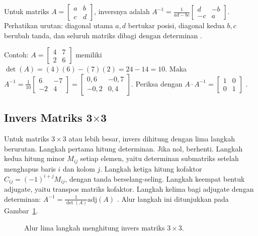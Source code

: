 \documentclass[11pt,a4paper]{article}
\begin{document}
Untuk matriks $A=\begin{bmatrix}a&b\\c&d\end{bmatrix}$, inversnya adalah $A^{-1}=\frac{1}{ad-bc}\begin{bmatrix}d&-b\\-c&a\end{bmatrix}$. Perhatikan urutan: diagonal utama $a,d$ bertukar posisi, diagonal kedua $b,c$ berubah tanda, dan seluruh matriks dibagi dengan determinan \cite{anton}.

Contoh: $A=\begin{bmatrix}4&7\\2&6\end{bmatrix}$ memiliki $\det(A)=(4)(6)-(7)(2)=24-14=10$. Maka $A^{-1}=\frac{1}{10}\begin{bmatrix}6&-7\\-2&4\end{bmatrix}=\begin{bmatrix}0{,}6&-0{,}7\\-0{,}2&0{,}4\end{bmatrix}$. Periksa dengan $A \cdot A^{-1}=\begin{bmatrix}1&0\\0&1\end{bmatrix}$ \cite{lipschutz}.

\subsection{Invers Matriks 3$\times$3}

Untuk matriks $3 \times 3$ atau lebih besar, invers dihitung dengan lima langkah berurutan. Langkah pertama hitung determinan. Jika nol, berhenti. Langkah kedua hitung minor $M_{ij}$ setiap elemen, yaitu determinan submatriks setelah menghapus baris $i$ dan kolom $j$. Langkah ketiga hitung kofaktor $C_{ij}=(-1)^{i+j} M_{ij}$, dengan tanda berselang-seling. Langkah keempat bentuk adjugate, yaitu transpos matriks kofaktor. Langkah kelima bagi adjugate dengan determinan: $A^{-1}=\frac{1}{\det(A)}\text{adj}(A)$ \cite{anton}. Alur langkah ini ditunjukkan pada Gambar~\ref{fig:alur-invers}.

\begin{figure}[H]
	\centering
	\caption{Alur lima langkah menghitung invers matriks $3 \times 3$.}
	\label{fig:alur-invers}
\end{figure}
\end{document}
